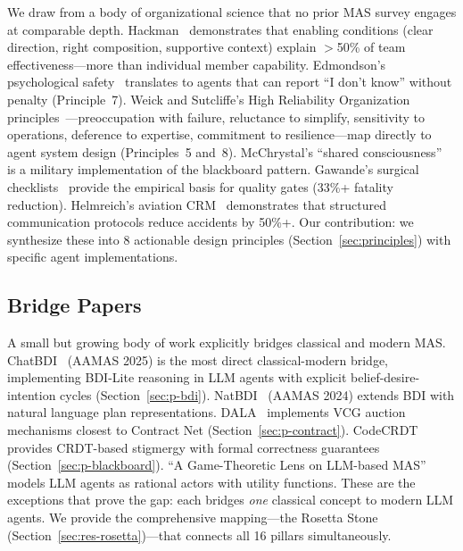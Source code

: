 \documentclass{article}
\begin{document}
We draw from a body of organizational science that no prior MAS survey engages at
comparable depth. Hackman~\citep{hackman2002leading} demonstrates that enabling
conditions (clear direction, right composition, supportive context) explain $>$50\%
of team effectiveness---more than individual member capability. Edmondson's
psychological safety~\citep{edmondson1999psychological} translates to agents that can
report ``I don't know'' without penalty (Principle~7). Weick and Sutcliffe's High
Reliability Organization principles~\citep{weick2001managing}---preoccupation with
failure, reluctance to simplify, sensitivity to operations, deference to expertise,
commitment to resilience---map directly to agent system design (Principles~5 and~8).
McChrystal's ``shared consciousness''~\citep{mcchrystal2015team} is a military
implementation of the blackboard pattern. Gawande's surgical
checklists~\citep{gawande2011checklist} provide the empirical basis for quality gates
(33\%+ fatality reduction). Helmreich's aviation CRM~\citep{helmreich1999cockpit}
demonstrates that structured communication protocols reduce accidents by 50\%+. Our
contribution: we synthesize these into 8 actionable design principles
(Section~\ref{sec:principles}) with specific agent implementations.

\subsection{Bridge Papers}
\label{sec:rel-bridge}

%
%

A small but growing body of work explicitly bridges classical and modern MAS.
ChatBDI~\citep{chatbdi2025} (AAMAS 2025) is the most direct classical-modern bridge,
implementing BDI-Lite reasoning in LLM agents with explicit belief-desire-intention
cycles (Section~\ref{sec:p-bdi}).
NatBDI~\citep{natbdi2024} (AAMAS 2024) extends BDI with natural language plan
representations.
DALA~\citep{dala2025} implements VCG auction mechanisms closest to Contract Net
(Section~\ref{sec:p-contract}).
CodeCRDT~\citep{codecrdt2025} provides CRDT-based stigmergy with formal correctness
guarantees (Section~\ref{sec:p-blackboard}).
``A Game-Theoretic Lens on LLM-based MAS''~\citep{gametheoretic2026} models
LLM agents as rational actors with utility functions.
These are the exceptions that prove the gap: each bridges \emph{one} classical concept
to modern LLM agents. We provide the comprehensive mapping---the Rosetta Stone
(Section~\ref{sec:res-rosetta})---that connects all 16 pillars simultaneously.
\end{document}
